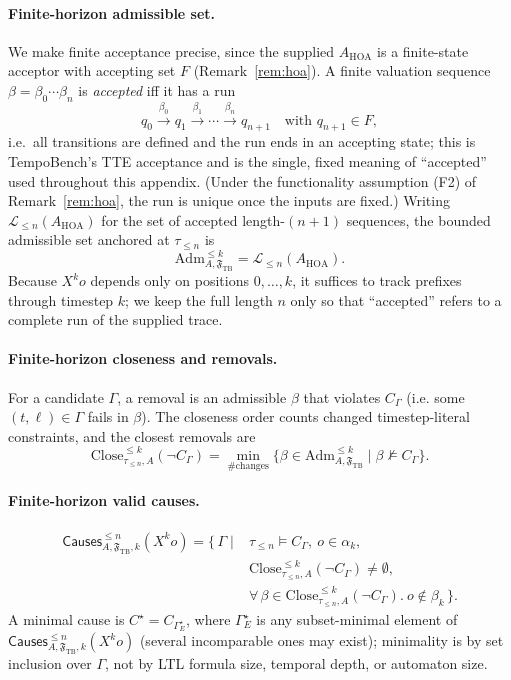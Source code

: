 \documentclass[11pt]{article}
\theoremstyle{remark}
\newcommand{\Close}{\mathrm{Close}}
\newcommand{\Lang}{\mathcal{L}}
\newcommand{\Frame}{\mathfrak{F}}
\newcommand{\Adm}{\mathrm{Adm}}
\begin{document}
\paragraph{Finite-horizon admissible set.}
We make finite acceptance precise, since the supplied \(A_{\mathrm{HOA}}\) is a
finite-state acceptor with accepting set \(F\) (Remark~\ref{rem:hoa}). A finite
valuation sequence \(\beta=\beta_0\cdots\beta_n\) is \emph{accepted} iff it has a
run
\[
  q_0\xrightarrow{\beta_0}q_1\xrightarrow{\beta_1}\cdots
  \xrightarrow{\beta_n}q_{n+1}
  \quad\text{with } q_{n+1}\in F ,
\]
i.e.\ all transitions are defined and the run ends in an accepting state; this is
TempoBench's TTE acceptance and is the single, fixed meaning of ``accepted'' used
throughout this appendix. (Under the functionality assumption (F2) of
Remark~\ref{rem:hoa}, the run is unique once the inputs are fixed.) Writing
\(\Lang_{\le n}(A_{\mathrm{HOA}})\) for the set of accepted length-\((n{+}1)\)
sequences, the bounded admissible set anchored at \(\tau_{\le n}\) is
\[
  \Adm^{\le k}_{A,\Frame_{\mathrm{TB}}}
  =\Lang_{\le n}(A_{\mathrm{HOA}}).
\]
Because \(X^k o\) depends only on positions \(0,\ldots,k\), it suffices to track
prefixes through timestep \(k\); we keep the full length \(n\) only so that
``accepted'' refers to a complete run of the supplied trace.

\paragraph{Finite-horizon closeness and removals.}
For a candidate \(\Gamma\), a removal is an admissible \(\beta\) that violates
\(C_\Gamma\) (i.e. some \((t,\ell)\in\Gamma\) fails in \(\beta\)). The closeness
order counts changed timestep-literal constraints, and the closest removals are
\[
  \Close^{\le k}_{\tau_{\le n},A}(\neg C_\Gamma)
  =\min_{\#\text{changes}}
   \{\beta\in\Adm^{\le k}_{A,\Frame_{\mathrm{TB}}}\mid \beta\not\models C_\Gamma\}.
\]

\paragraph{Finite-horizon valid causes.}
\[
\begin{aligned}
  \mathsf{Causes}^{\le n}_{A,\Frame_{\mathrm{TB}},k}(X^k o)
  =\{\,\Gamma\mid{}&
  \tau_{\le n}\models C_\Gamma,\ o\in\alpha_k,\\
  &\Close^{\le k}_{\tau_{\le n},A}(\neg C_\Gamma)\neq\emptyset,\\
  &\forall\,\beta\in\Close^{\le k}_{\tau_{\le n},A}(\neg C_\Gamma).\ o\notin\beta_k
  \,\}.
\end{aligned}
\]
A minimal cause is \(C^\star=C_{\Gamma_E^\star}\), where \(\Gamma_E^\star\) is any
subset-minimal element of
\(\mathsf{Causes}^{\le n}_{A,\Frame_{\mathrm{TB}},k}(X^k o)\) (several incomparable
ones may exist); minimality is by set inclusion over \(\Gamma\), not by LTL
formula size, temporal depth, or automaton size.
\end{document}
